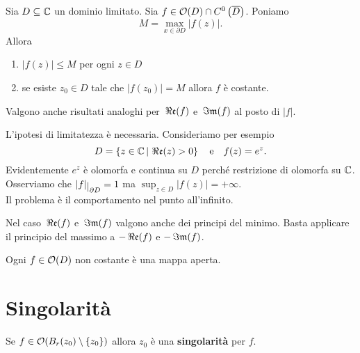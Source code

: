 \begin{multicols*}{2}
\begin{corollary}\label{PrincipioMassimo2}
Sia $D\subseteq \mathbb{C}$ un dominio limitato. Sia $f\in \mathcal{O}(D)\cap C^0\left(\overline{D}\right)$. Poniamo
\[M=\max_{x\in \partial D}|f(z)|.\]
Allora
\begin{enumerate}[noitemsep]
\item $|f(z)|\leq M$ per ogni $z\in D$
\item se esiste $z_0\in D$ tale che $|f(z_0)|=M$ allora $f$ \`e costante.
\end{enumerate}
Valgono anche risultati analoghi per $\,\Re\mathfrak{e}(f)$ e $\,\Im\mathfrak{m}(f)$ al posto di $|f|$.
\end{corollary}
\begin{remark}
L'ipotesi di limitatezza \`e necessaria. Consideriamo per esempio
\[D=\left\{z\in\mathbb{C}\,\middle|\,\,\Re\mathfrak{e}(z)>0\right\}\quad\text{e}\quad f(z)=e^z.\]
Evidentemente $e^z$ \`e olomorfa e continua su $D$ perch\'e restrizione di olomorfa su $\mathbb{C}$. Osserviamo che $|f|\res{\partial D}=1$ ma $\displaystyle\sup_{z\in D}|f(z)|=+\infty$.\\
Il problema \`e il comportamento nel punto all'infinito.
\end{remark}
\begin{remark}
Nel caso $\,\Re\mathfrak{e}(f)$ e $\,\Im\mathfrak{m}(f)$ valgono anche dei principi del minimo. Basta applicare il principio del massimo a $-\,\Re\mathfrak{e}(f)$ e $-\,\Im\mathfrak{m}(f)$.
\end{remark}

\begin{theorem}\label{TeoremaApplicazioneAperta}
Ogni $f\in \mathcal{O}(D)$ non costante \`e una mappa aperta.
\end{theorem}

\section{Singolarit\`a}
\begin{definition}[Singolarit\`a]
Se $f\in \mathcal{O}(B_r(z_0)\setminus\{z_0\})$ allora $z_0$ \`e una \textbf{singolarit\`a} per $f$.
\end{definition}



\end{multicols*}
